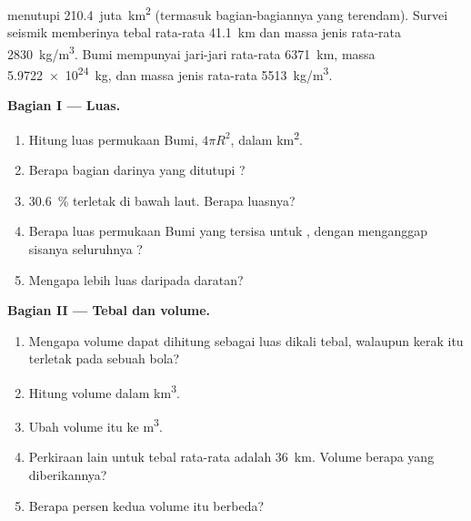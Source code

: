 \begin{problem}
\label{pb:g12:continental-crust:1}
 menutupi \num{210.4}~juta~\unit{km^2} (termasuk bagian-bagiannya
yang terendam). Survei seismik memberinya tebal rata-rata \qty{41.1}{km} dan
massa jenis rata-rata \qty{2830}{kg/m^3}. Bumi mempunyai jari-jari rata-rata
\qty{6371}{km}, massa \qty{5.9722e24}{kg}, dan massa jenis rata-rata
\qty{5513}{kg/m^3}.

\medskip
\noindent\textbf{Bagian I --- Luas.}
\begin{enumerate}
  \item Hitung luas permukaan Bumi, $4\pi R^2$, dalam
        \unit{km^2}.
  \item Berapa bagian darinya yang ditutupi ?
  \item \qty{30.6}{\percent}  terletak di bawah laut.
        Berapa luasnya?
  \item Berapa luas permukaan Bumi yang tersisa untuk , dengan
        menganggap sisanya seluruhnya ?
  \item Mengapa  lebih luas daripada daratan?
\end{enumerate}

\medskip
\noindent\textbf{Bagian II --- Tebal dan volume.}
\begin{enumerate}[resume]
  \item Mengapa volume dapat dihitung sebagai luas dikali tebal, walaupun
        kerak itu terletak pada sebuah bola?
  \item Hitung volume  dalam \unit{km^3}.
  \item Ubah volume itu ke \unit{m^3}.
  \item Perkiraan lain untuk tebal rata-rata adalah \qty{36}{km}. Volume berapa
        yang diberikannya?
  \item Berapa persen kedua volume itu berbeda?
\end{enumerate}


\end{problem}

